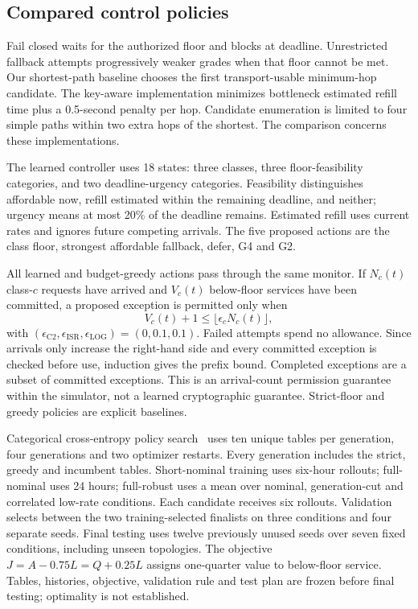 \documentclass[conference,a4paper]{IEEEtran}
\begin{document}
\subsection{Compared control policies}
Fail closed waits for the authorized floor and blocks at deadline. Unrestricted fallback attempts progressively weaker grades when that floor cannot be met. Our shortest-path baseline chooses the first transport-usable minimum-hop candidate. The key-aware implementation minimizes bottleneck estimated refill time plus a 0.5-second penalty per hop. Candidate enumeration is limited to four simple paths within two extra hops of the shortest. The comparison concerns these implementations.

The learned controller uses 18 states: three classes, three floor-feasibility categories, and two deadline-urgency categories. Feasibility distinguishes affordable now, refill estimated within the remaining deadline, and neither; urgency means at most 20\% of the deadline remains. Estimated refill uses current rates and ignores future competing arrivals. The five proposed actions are the class floor, strongest affordable fallback, defer, G4 and G2.

All learned and budget-greedy actions pass through the same monitor. If $N_c(t)$ class-$c$ requests have arrived and $V_c(t)$ below-floor services have been committed, a proposed exception is permitted only when
\begin{equation}\label{eq:budget}
V_c(t)+1\leq\lfloor\epsilon_cN_c(t)\rfloor,
\end{equation}
with $(\epsilon_{\mathrm{C2}},\epsilon_{\mathrm{ISR}},\epsilon_{\mathrm{LOG}})=(0,0.1,0.1)$. Failed attempts spend no allowance. Since arrivals only increase the right-hand side and every committed exception is checked before use, induction gives the prefix bound. Completed exceptions are a subset of committed exceptions. This is an arrival-count permission guarantee within the simulator, not a learned cryptographic guarantee. Strict-floor and greedy policies are explicit baselines.

Categorical cross-entropy policy search~\cite{cem} uses ten unique tables per generation, four generations and two optimizer restarts. Every generation includes the strict, greedy and incumbent tables. Short-nominal training uses six-hour rollouts; full-nominal uses 24 hours; full-robust uses a mean over nominal, generation-cut and correlated low-rate conditions. Each candidate receives six rollouts. Validation selects between the two training-selected finalists on three conditions and four separate seeds. Final testing uses twelve previously unused seeds over seven fixed conditions, including unseen topologies. The objective $J=A-0.75L=Q+0.25L$ assigns one-quarter value to below-floor service. Tables, histories, objective, validation rule and test plan are frozen before final testing; optimality is not established.
\end{document}
